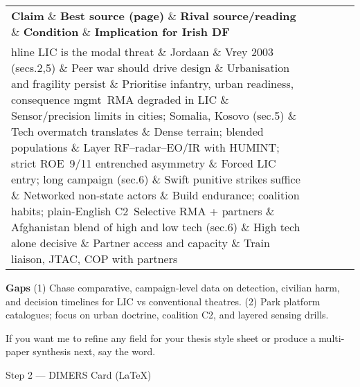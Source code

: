  
\begin{tabular}{p{3.2cm}p{4.2cm}p{3.6cm}p{3.2cm}p{4.2cm}}
	\textbf{Claim} \& \textbf{Best source (page)} \& \textbf{Rival source/reading} \& \textbf{Condition} \& \textbf{Implication for Irish DF}\\hline
	LIC is the modal threat \& Jordaan \& Vrey 2003 (secs.2,5) \& Peer war should drive design \& Urbanisation and fragility persist \& Prioritise infantry, urban readiness, consequence mgmt\
	RMA degraded in LIC \& Sensor/precision limits in cities; Somalia, Kosovo (sec.5) \& Tech overmatch translates \& Dense terrain; blended populations \& Layer RF–radar–EO/IR with HUMINT; strict ROE\
	9/11 entrenched asymmetry \& Forced LIC entry; long campaign (sec.6) \& Swift punitive strikes suffice \& Networked non-state actors \& Build endurance; coalition habits; plain-English C2\
	Selective RMA + partners \& Afghanistan blend of high and low tech (sec.6) \& High tech alone decisive \& Partner access and capacity \& Train liaison, JTAC, COP with partners\
\end{tabular}


\textbf{Gaps}
(1) Chase comparative, campaign-level data on detection, civilian harm, and decision timelines for LIC vs conventional theatres.
(2) Park platform catalogues; focus on urban doctrine, coalition C2, and layered sensing drills.

If you want me to refine any field for your thesis style sheet or produce a multi-paper synthesis next, say the word.

\parencite{CHEBAN_2003}
Step 2 — DIMERS Card (LaTeX)

